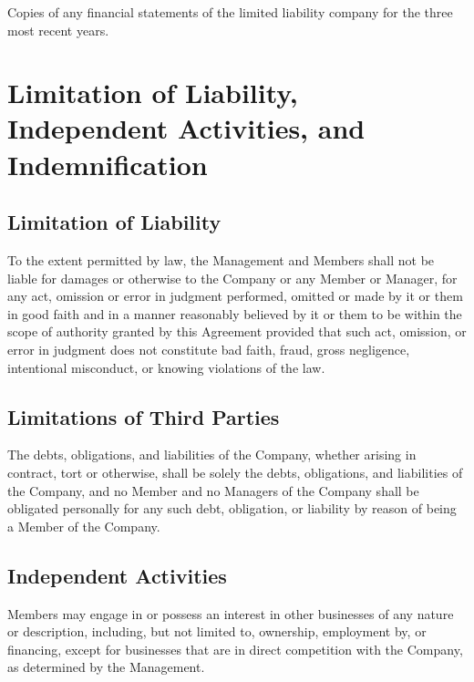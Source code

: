 \documentclass[11pt,onecolumn]{article}
\begin{document}
\subsubsection{}

Copies of any financial statements of the limited liability company for the three most recent years.

\section{Limitation of Liability, Independent Activities, and Indemnification}

\subsection{Limitation of Liability}

To the extent permitted by law, the Management and Members shall not be liable for damages or otherwise to the Company or any Member or Manager, for any act, omission or error in judgment performed, omitted or made by it or them in good faith and in a manner reasonably believed by it or them to be within the scope of authority granted by this Agreement provided that such act, omission, or error in judgment does not constitute bad faith, fraud, gross negligence, intentional misconduct, or knowing violations of the law.

\subsection{Limitations of Third Parties}

The debts, obligations, and liabilities of the Company, whether arising in contract, tort or otherwise, shall be solely the debts, obligations, and liabilities of the Company, and no Member and no Managers of the Company shall be obligated personally for any such debt, obligation, or liability by reason of being a Member of the Company.

\subsection{Independent Activities}

Members may engage in or possess an interest in other businesses of any nature or description, including, but not limited to, ownership, employment by, or financing, except for businesses that are in direct competition with the Company, as determined by the Management.
\end{document}
